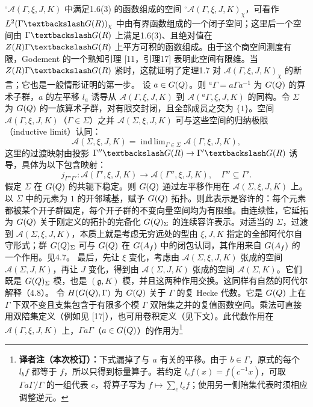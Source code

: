 $^\circ\mathcal A(\Gamma,\xi,J,K)$ 中满足1.6(3) 的函数组成的空间 $^\circ\mathcal A(\Gamma,\xi,J,K)_\chi$，可看作 $L^2(\Gamma\backslash G(\R))_\chi$ 中由有界函数组成的一个闭子空间；这里后一个空间由 $\Gamma\backslash G(\R)$ 上满足1.6(3)、且绝对值在 $Z(\R)\Gamma\backslash G(\R)$ 上平方可积的函数组成。由于这个商空间测度有限，Godement 的一个熟知引理 [11，引理17] 表明此空间有限维。当 $Z(\R)\Gamma\backslash G(\R)$ 紧时，这就证明了定理1.7 对 $\mathcal A(\Gamma,\xi,J,K)_\chi$ 的断言；它也是一般情形证明的第一步。
设 $a\in G(Q)$。则 ${}^a\Gamma=a\Gamma a^{-1}$ 为 $G(Q)$ 的算术子群，$a$ 的左平移 $l_a$ 诱导从 $\mathcal A(\Gamma,\xi,J,K)$ 到 $\mathcal A({}^a\Gamma,\xi,J,K)$ 的同构。令 $\Sigma$ 为 $G(Q)$ 的一族算术子群，对有限交封闭，且全部成员之交为 $\{1\}$。空间 $\mathcal A(\Gamma,\xi,J,K)$（$\Gamma\in\Sigma$）之并 $\mathcal A(\Sigma,\xi,J,K)$ 可与这些空间的归纳极限（inductive limit）认同：
\[
\mathcal A(\Sigma,\xi,J,K)=\mathop{\mathrm{ind\,lim}}_{\Gamma\in\Sigma}\mathcal A(\Gamma,\xi,J,K),\tag{1}
\]
这里的过渡映射由投影 $\Gamma''\backslash G(\R)\to\Gamma'\backslash G(\R)$ 诱导，具体为以下包含映射：
\[
j_{\Gamma''\Gamma'}:\mathcal A(\Gamma',\xi,J,K)\longrightarrow\mathcal A(\Gamma'',\xi,J,K),\quad\Gamma''\subseteq\Gamma'.\tag{2}
\]
假定 $\Sigma$ 在 $G(Q)$ 的共轭下稳定。则 $G(Q)$ 通过左平移作用在 $\mathcal A(\Sigma,\xi,J,K)$ 上。以 $\Sigma$ 中的元素为 $1$ 的开邻域基，赋予 $G(Q)$ 拓扑。则此表示是容许的：每个元素都被某个开子群固定，每个开子群的不变向量空间均为有限维。由连续性，它延拓为 $G(Q)$ 关于刚定义的拓扑的完备化 $G(Q)_\Sigma$ 的连续容许表示。对适当的 $\Sigma$，过渡到 $\mathcal A(\Sigma,\xi,J,K)$，本质上就是考虑无穷远处的型由 $\xi,J,K$ 指定的全部阿代尔自守形式；群 $G(Q)_\Sigma$ 可与 $G(Q)$ 在 $G(A_f)$ 中的闭包认同，其作用来自 $G(A_f)$ 的一个作用。见4.7。
最后，先让 $\xi$ 变化，考虑由 $\mathcal A(\Sigma,\xi,J,K)$ 张成的空间 $\mathcal A(\Sigma,J,K)$，再让 $J$ 变化，得到由 $\mathcal A(\Sigma,J,K)$ 张成的空间 $\mathcal A(\Sigma,K)$。它们既是 $G(Q)_\Sigma$ 模，也是 $(\mathfrak g,K)$ 模，并且这两种作用交换。这同样有自然的阿代尔解释（4.8）。
令 $H(G(Q),\Gamma)$ 为 $G(Q)$ 关于 $\Gamma$ 的复 Hecke 代数。它是 $G(Q)$ 上在 $\Gamma$ 下双不变且支集包含于有限多个模 $\Gamma$ 双陪集之并的复值函数空间。乘法可直接用双陪集定义（例如见 [17]），也可用卷积定义（见下文）。此代数作用在 $\mathcal A(\Gamma,\xi,J,K)$ 上，$\Gamma a\Gamma$（$a\in G(Q)$）的作用为\footnote{\textbf{译者注（本次校订）：}下式漏掉了与 $a$ 有关的平移。由于 $b\in\Gamma$，原式的每个 $l_bf$ 都等于 $f$，所以只得到标量算子。若约定 $l_cf(x)=f(c^{-1}x)$，可取 $\Gamma a\Gamma/\Gamma$ 的一组代表 $c$，将算子写为 $f\mapsto\sum_c l_cf$；使用另一侧陪集代表时须相应调整逆元。}

